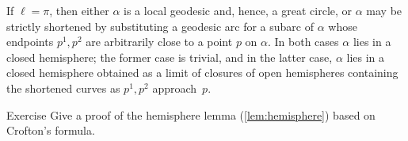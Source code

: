 If $\ell=\pi$, then either $\alpha$ is a local geodesic and, hence, a great circle, 
or $\alpha$ may be strictly shortened by substituting a geodesic arc for a subarc of $\alpha$ 
whose endpoints $p^1,p^2$ are arbitrarily close to a point $p$ on $\alpha$.
In both cases $\alpha$ lies in a closed hemisphere;
the former case is trivial, and in the latter case, $\alpha$ lies in a closed hemisphere obtained as a limit of closures of open hemispheres containing the shortened curves as $p^1,p^2$ approach~$p$.
\qeds


\begin{thm}{Exercise}\label{exr-crofton}
Give a proof of the hemisphere lemma (\ref{lem:hemisphere}) based on Crofton's formula.
\end{thm}

